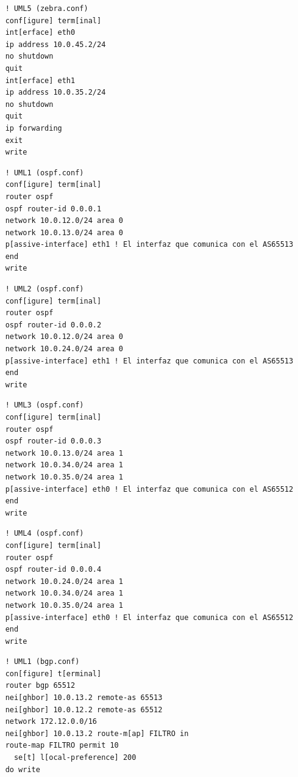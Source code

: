 \documentclass{article}
\begin{document}
  \begin{verbatim}
    ! UML5 (zebra.conf)
    conf[igure] term[inal]
    int[erface] eth0
    ip address 10.0.45.2/24
    no shutdown
    quit
    int[erface] eth1
    ip address 10.0.35.2/24
    no shutdown
    quit
    ip forwarding
    exit
    write
  \end{verbatim}

  \begin{verbatim}
    ! UML1 (ospf.conf)
    conf[igure] term[inal]
    router ospf
    ospf router-id 0.0.0.1
    network 10.0.12.0/24 area 0
    network 10.0.13.0/24 area 0
    p[assive-interface] eth1 ! El interfaz que comunica con el AS65513
    end
    write
  \end{verbatim}

  \begin{verbatim}
    ! UML2 (ospf.conf)
    conf[igure] term[inal]
    router ospf
    ospf router-id 0.0.0.2
    network 10.0.12.0/24 area 0
    network 10.0.24.0/24 area 0
    p[assive-interface] eth1 ! El interfaz que comunica con el AS65513
    end
    write
  \end{verbatim}

  \begin{verbatim}
    ! UML3 (ospf.conf)
    conf[igure] term[inal]
    router ospf
    ospf router-id 0.0.0.3
    network 10.0.13.0/24 area 1
    network 10.0.34.0/24 area 1
    network 10.0.35.0/24 area 1
    p[assive-interface] eth0 ! El interfaz que comunica con el AS65512
    end
    write
  \end{verbatim}

  \begin{verbatim}
    ! UML4 (ospf.conf)
    conf[igure] term[inal]
    router ospf
    ospf router-id 0.0.0.4
    network 10.0.24.0/24 area 1
    network 10.0.34.0/24 area 1
    network 10.0.35.0/24 area 1
    p[assive-interface] eth0 ! El interfaz que comunica con el AS65512
    end
    write
  \end{verbatim}

  \begin{verbatim}
    ! UML1 (bgp.conf)
    con[figure] t[erminal]
    router bgp 65512
    nei[ghbor] 10.0.13.2 remote-as 65513
    nei[ghbor] 10.0.12.2 remote-as 65512
    network 172.12.0.0/16
    nei[ghbor] 10.0.13.2 route-m[ap] FILTRO in
    route-map FILTRO permit 10
      se[t] l[ocal-preference] 200
    do write
  \end{verbatim}
\end{document}
